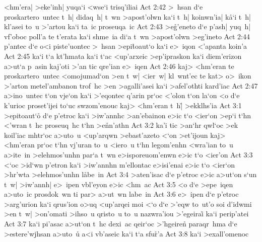 <hm'era|
>eke'inh|
yuqa`i
<wse`i
trisq'iliai\bibvsend
\vs Act 2:42
>~hsan
d`e
proskartero~untec
t~h|
didaq~h|
t~wn
>apost'olwn
ka`i
t~h|
koinwn'ia|
k\r{a}`i
t~h|
kl'asei
to~u
>'artou
ka`i
ta~ic
proseuqa~ic\bibvsend
\vs Act 2:43
>e\r{g}'eneto
d`e
p'ash|
yuq~h|
vf'oboc
poll'a
te
t'erata
ka`i
shme~ia
di`a
t~wn
>apost'olwn
>eg'ineto\bibvsend
\vs Act 2:44
p'antec
d`e
o<i
piste'uontec
>~hsan
>epi\r{t}oaut`o
ka`i
e>~iqon
<'apanta
koin'a\bibvsend
\vs Act 2:45
ka`i
t`a
kt'hmata
ka`i
t`ac
<up'arxeic
>ep'ipraskon
ka`i
diem'erizon
a>ut`a
p~asin
kaj'oti
>'an
tic
qre'ian
e>~iqen\bibvsend
\vs Act 2:46
kaj>
<hm'eran
te
proskartero~untec
<omojumad`on
>en
t~w|
<ier~w|
kl~wnt'ec
te
kat>
o>~ikon
>'arton
metel'ambanon
trof~hc
>en
>agalli'asei
ka`i
>afel'othti
kard'iac\bibvsend
\vs Act 2:47
a>ino~untec
t`on
vje`on
ka`i
>'eqontec
q'arin
pr`oc
<'olon
t`on
la`on
<o
d`e
k'urioc
proset'ijei
to`uc
swzom'enouc
kaj>
<hm'eran
t~h|\r{}
>ekklhs'ia\bibvsend
\vs Act 3:1
>epitoaut`o\r{}
d`e
p'etroc
ka`i
>iw'annhc
>an'ebainon
e>ic
t`o
<ier`on
>ep`i
t`hn
<'wran
t~hc
proseuq~hc
t`hn
>e\r{n}n'athn\bibvsend
{}
\vs Act 3:2
ka'i
tic
>an`hr
qwl`oc
>ek
koil'iac
mhtr`oc
a>uto~u
<up'arqwn
>ebast'azeto
<`on
>et'ijoun
kaj>
<hm'eran
pr`oc
t`hn
vj'uran
to~u
<iero~u
t`hn
legom'enhn
<wra'ian
to~u
a>ite~in
>elehmos'unhn
par`a
t~wn
e>isporeuom'enwn
e>ic
t`o
<ier'on\bibvsend
\vs Act 3:3
<`oc
>id`wn
p'etron
ka`i
>iw'annhn
m'ellontac
e>isi'enai
e>ic
t`o
<ier`on
>hr'wta
>elehmos'unhn
l\r{a}be~in\bibvsend
{}
\vs Act 3:4
>aten'isac
d`e
p'etroc
e>ic
a>ut`on
s`un
t~w|
>iw'annh|
e>~ipen
vbl'eyon
e>ic
<hm~ac\bibvsend
\vs Act 3:5
<o
d`e
>epe~iqen
a>uto~ic
prosdok~wn
ti
par>
a>ut~wn
labe~in\bibvsend
\vs Act 3:6
e>~ipen
d`e
p'etroc
>arg'urion
ka`i
qrus'ion
o>uq
<up'arqei
moi
<`o
d`e
>'eqw
to~ut'o
soi
d'idwmi
>en
t~w|
>on'omati
>ihso~u
qristo~u
to~u
nazwra'iou
>'egeirai\r{}
ka`i
perip'atei\bibvsend
\vs Act 3:7
ka`i
pi'asac
a>ut`on
t~hc
dexi~ac
qeir`oc
>'hgeire\r{n}
paraqr~hma
d`e
>estere'wjhsan
a>uto~u\r{}
a<i
vb'aseic
ka`i
t`a
sfu\r{r}'a\bibvsend
{}
\vs Act 3:8
ka`i
>exall'omenoc
